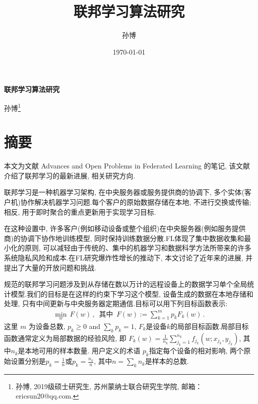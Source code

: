 \documentclass[a4paper]{article}
\title{联邦学习算法研究}
\author{孙博}
\date{\today}
\theoremstyle{definition}
\numberwithin{equation}{section}
\begin{document}

\maketitle
\tableofcontents 

\newpage
\centerline{\huge \bf 联邦学习算法研究}
\vspace{5mm}
\centerline{%
孙博\footnote{孙博, 2019级硕士研究生, 苏州蒙纳士联合研究生学院, 邮箱：ericsun20@qq.com.} 
}
\vspace{5mm}

\section*{摘要}


本文为文献 Advances and Open Problems in Federated Learning \citep{arxiv-Kairouz-Mcmahan-etc2019} 的笔记, 该文献介绍了联邦学习的最新进展, 相关研究方向.
  
联邦学习是一种机器学习架构, 在中央服务器或服务提供商的协调下, 多个实体(客户机)协作解决机器学习问题.每个客户的原始数据存储在本地, 不进行交换或传输;相反, 用于即时聚合的重点更新用于实现学习目标. 

在这种设置中, 许多客户(例如移动设备或整个组织)在中央服务器(例如服务提供商)的协调下协作地训练模型, 同时保持训练数据分散.FL体现了集中数据收集和最小化的原则, 可以减轻由于传统的、集中的机器学习和数据科学方法所带来的许多系统隐私风险和成本.在FL研究爆炸性增长的推动下, 本文讨论了近年来的进展, 并提出了大量的开放问题和挑战. 

规范的联邦学习问题涉及到从存储在数以万计的远程设备上的数据学习单个全局统计模型.我们的目标是在这样的约束下学习这个模型, 设备生成的数据在本地存储和处理, 只有中间更新与中央服务器定期通信.目标可以用下列目标函数表示:
\begin{align*}
    \min_w \,  F(w) \,  ,  \, \, \,  \text{其中} \, \, \,  F(w) := \sum_{k=1}^m p_k F_k(w) \,  . \label{eq:original_obj}
\end{align*}
这里 $m$ 为设备总数,  $p_k \geq 0$ and $\sum_k p_k=1$,   $F_k$是设备$k$的局部目标函数.局部目标函数通常定义为局部数据的经验风险,  即 $F_k(w) = \frac{1}{n_k}\sum_{j_k=1}^{n_k} f_{j_k}(w; x_{j_k},  y_{j_k})$,  其中$n_k$是本地可用的样本数量. 用户定义的术语 $p_k$指定每个设备的相对影响, 两个原始设置分别是$p_k=\frac{1}{n}$或$p_k=\frac{n_k}{n}$, 其中$n=\sum_k n_k$是样本的总数.\citep{li2019federated}
 
\end{document}
